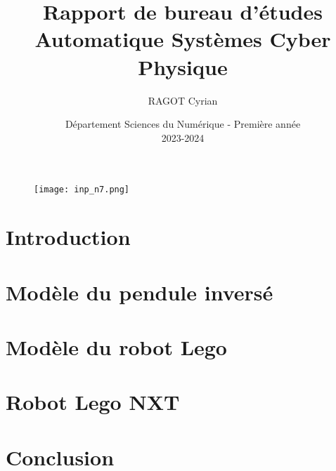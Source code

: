 \documentclass[11pt,french]{article} %
\begin{document}
\begin{figure}[t]
    \centering
		\advance\leftskip-0.2cm
    \texttt{[image: inp\_n7.png]} %
\end{figure}

\title{\vspace{0.5cm} \textbf{Rapport de bureau d'études\\Automatique Systèmes Cyber Physique}} 
\author{RAGOT Cyrian}
\renewcommand{\maketitlehookc}{%
	\vspace{3cm}
  \begin{center}
		\texttt{[image: segway.png]}
  \end{center}
}
\date{\vspace{1cm}\vfill Département Sciences du Numérique - Première année \\
2023-2024 }

\maketitle

\newpage %
\tableofcontents %
\newpage

\section{Introduction}


\newpage
\section{Modèle du pendule inversé}

\newpage
\section{Modèle du robot Lego}

\newpage
\section{Robot Lego NXT}

\newpage
\section{Conclusion}
\end{document}
